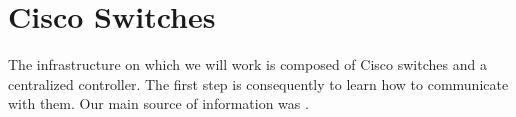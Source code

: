 \section{Cisco Switches}
The infrastructure on which we will work is composed of Cisco switches and a centralized controller. The first step is consequently to learn how to communicate with them. Our main source of information was \cite{Smith:2010:CWL:1951601}.